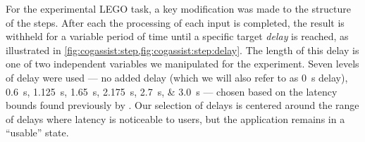 \documentclass[10pt,letterpaper]{article}
\providecommand{\DIFaddtex}[1]{#1} %
\providecommand{\DIFdeltex}[1]{} %
\providecommand{\DIFaddbegin}{\protect\color{blue}} %
\providecommand{\DIFaddend}{\protect\color{black}} %
\providecommand{\DIFdelbegin}{\protect\color{red}} %
\providecommand{\DIFdelend}{\protect\color{black}} %
\providecommand{\DIFadd}[1]{\texorpdfstring{\DIFaddtex{#1}}{#1}} %
\providecommand{\DIFdel}[1]{\texorpdfstring{\DIFdeltex{#1}}{}} %
\newcommand{\DIFscaledelfig}{0.5}
\newlength{\DIFdelgraphicswidth} %
\newlength{\DIFdelgraphicsheight} %
\newcommand{\DIFaddincludegraphics}[2][]{{\color{blue}\fbox{\DIFOincludegraphics[#1]{#2}}}} %
\newcommand{\DIFdelincludegraphics}[2][]{%
\sbox{\DIFdelgraphicsbox}{\DIFOincludegraphics[#1]{#2}}%
\settoboxwidth{\DIFdelgraphicswidth}{\DIFdelgraphicsbox} %
\settoboxtotalheight{\DIFdelgraphicsheight}{\DIFdelgraphicsbox} %
\scalebox{\DIFscaledelfig}{%
\parbox[b]{\DIFdelgraphicswidth}{\usebox{\DIFdelgraphicsbox}\\[-\baselineskip] \rule{\DIFdelgraphicswidth}{0em}}\llap{\resizebox{\DIFdelgraphicswidth}{\DIFdelgraphicsheight}{%
\setlength{\unitlength}{\DIFdelgraphicswidth}%
\begin{picture}(1,1)%
\thicklines\linethickness{2pt} %
{\color[rgb]{1,0,0}\put(0,0){\framebox(1,1){}}}%
{\color[rgb]{1,0,0}\put(0,0){\line( 1,1){1}}}%
{\color[rgb]{1,0,0}\put(0,1){\line(1,-1){1}}}%
\end{picture}%
}\hspace*{3pt}}} %
} %
\DeclareRobustCommand{\DIFaddbegin}{\DIFOaddbegin \let\includegraphics\DIFaddincludegraphics} %
\DeclareRobustCommand{\DIFaddend}{\DIFOaddend \let\includegraphics\DIFOincludegraphics} %
\DeclareRobustCommand{\DIFdelbegin}{\DIFOdelbegin \let\includegraphics\DIFdelincludegraphics} %
\DeclareRobustCommand{\DIFdelend}{\DIFOaddend \let\includegraphics\DIFOincludegraphics} %
\begin{document}
For the experimental LEGO task, a key modification was made to the structure of the steps.
After each the processing of each input \DIFdelbegin \DIFdel{frame }\DIFdelend is completed, the result is withheld for a variable period of time until a specific target \emph{delay} is reached, as illustrated in \DIFdelbegin \DIFdel{figure \cref{fig:cogassist:step:delay}}\DIFdelend \DIFaddbegin \DIFadd{\cref{fig:cogassist:step,fig:cogassist:step:delay}}\DIFaddend .
The length of this delay is one of two independent variables we manipulated for the experiment.
Seven levels of delay were used --- no added delay (which we will also refer to as \SI{0}{\second} delay), \SIlist{0.6;1.125;1.65;2.175;2.7;3.0}{\second} --- chosen based on the latency bounds found previously by \textcite{Chen:AnEmpiricalStudyOfLatency}.
\DIFdelbegin \DIFdel{A value of  \SI{600}{\milli\second} was identified as the bound where users start noticing delays in the assistant.
Conversely, \SI{2.7}{\second} was identified as the upper bound on delays after which the application is considered to be in such a degraded state it is basically ``unusable''.
Thus, our }\DIFdelend %
\DIFaddbegin \DIFadd{Our }\DIFaddend selection of delays is centered around the range of delays where latency is noticeable to users, but the application remains in a ``usable'' state\DIFdelbegin \DIFdel{, while including one delay value in the unnoticeable range and one completely in the ``unusable'' range.
}\DIFdelend \DIFaddbegin \DIFadd{.
}\DIFaddend 
\end{document}

